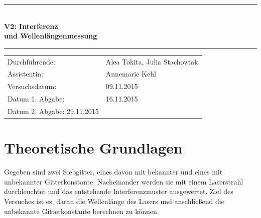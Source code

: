 \documentclass[12pt,a4paper,titlepage,headinclude,bibtotoc]{scrartcl}
\begin{document}
\begin{titlepage}
\centering

\vspace*{3cm}

\rule{\textwidth}{1pt}\\[0.5cm]
{\huge \bfseries
  V2: Interferenz\\[1.5ex]
  und Wellenlängenmessung}\\[0.5cm]
\rule{\textwidth}{1pt}

\vspace*{3cm}


\begin{Large}
\begin{tabular}{ll}
Durchführende: &  Alea Tokita, Julia Stachowiak\\
Assistentin: & Annemarie Kehl\\
 Versuchsdatum: & 09.11.2015\\
 Datum 1. Abgabe: & 16.11.2015\\
 Datum 2. Abgabe: 29.11.2015\\
\end{tabular}
\end{Large}

\vspace*{2.5cm}

\begin{Large}
\end{Large}

\end{titlepage}

\tableofcontents

\newpage

\section{Theoretische Grundlagen}
Gegeben sind zwei Siebgitter, eines davon mit bekannter und eines mit unbekannter Gitterkonstante. Nacheinander werden sie mit einem Laserstrahl durchleuchtet und das entstehende Interferenzmuster ausgewertet. Ziel des Versuches ist es, daran die Wellenlänge des Lasers und anschließend die unbekannte Gitterkonstante berechnen zu können.
\end{document}

